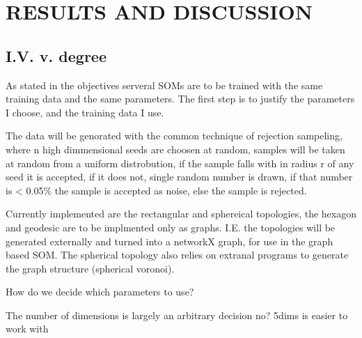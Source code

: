 \chapter{RESULTS AND DISCUSSION}



\section{I.V. v. degree}

As stated in the objectives serveral SOMs are to be trained with the same
training data and the same parameters.  The first step is to justify the
parameters I choose, and the training data I use.

The data will be genorated with the common technique of rejection sampeling,
where n high dimmensional seeds are choosen at random, samples will be taken
at random from a uniform distrobution, if the sample falls with in radius r of
any seed it is accepted, if it does not, single random number is drawn, if that
number is < 0.05\% the sample is accepted as noise, else the sample is rejected.

Currently implemented are the rectangular and sphereical topologies, the hexagon
and geodesic are to be implmented only as graphs.  I.E. the topologies will be
generated externally and turned into a networkX graph, for use in the graph
based SOM. The spherical topology also relies on extranal programs to generate
the graph structure (spherical voronoi).

How do we decide which parameters to use?

The number of dimensions is largely an arbitrary decision no?
5dims is easier to work with

